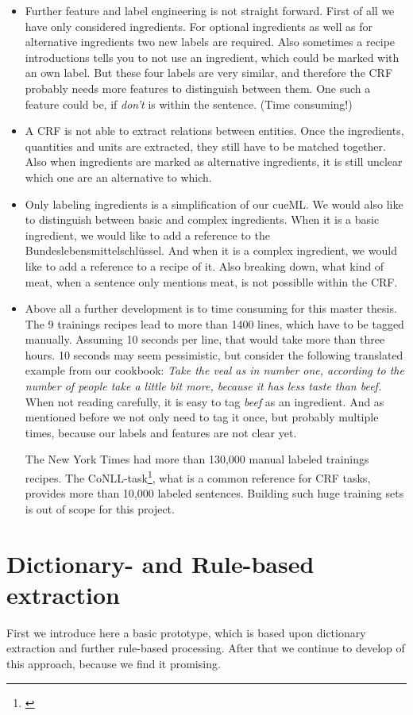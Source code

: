 \documentclass[12pt, twoside]{report}
\begin{document}
\begin{itemize}
	\item Further feature and label engineering is not straight forward. First of all we have only considered ingredients. For optional ingredients as well as for alternative ingredients two new labels are required. Also sometimes a recipe introductions tells you to not use an ingredient, which could be marked with an own label. But these four
	labels are very similar, and therefore the CRF probably needs more features to distinguish between them. One such a feature could be, if \textit{don't} is within the sentence.
	(Time consuming!)
	\item A CRF is not able to extract relations between entities. Once the ingredients, quantities and units are extracted, they still have to be matched together. Also when ingredients are marked as alternative ingredients, it is still unclear which one are an alternative to which.
	\item Only labeling ingredients is a simplification of our cueML. We would also like to distinguish between basic and complex ingredients. When it is a basic ingredient, we would like to add a reference to the Bundeslebensmittelschlüssel. And when it is a complex ingredient, we would like to add a reference to a recipe of it. Also breaking down, what kind of meat, when a sentence only mentions meat, is not possiblle within the CRF.
	\item Above all a further development is to time consuming for this master thesis. The 9 trainings recipes lead to more than 1400 lines, which have to be tagged manually. Assuming 10 seconds per line, that would take more than three hours. 10 seconds may seem pessimistic, but consider the following translated example from our cookbook: \textit{Take the veal as in number one, according to the number of people take a little bit more, because it has less taste than beef.} When not reading carefully, it is easy to tag \textit{beef} as an ingredient. And as mentioned before we not only need to tag it once, but probably multiple times, because our labels and features are not clear yet.
	
	The New York Times had more than 130,000 manual labeled trainings recipes. The CoNLL-task\footnote{\parencite{TjongKimSang2003}}, what is a common reference for CRF tasks, provides more than 10,000 labeled sentences. Building such huge training sets is out of scope for this project.
\end{itemize}


\chapter{Dictionary- and Rule-based extraction}
First we introduce here a basic prototype, which is based upon dictionary extraction and further rule-based processing. After that we continue to develop of this approach, because we find it promising.
\end{document}
